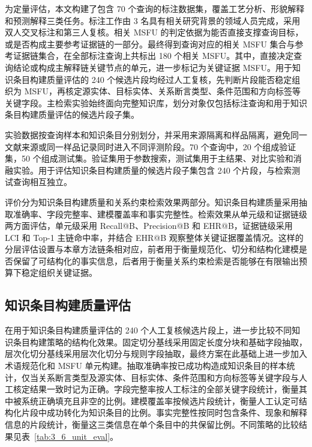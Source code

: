 为定量评估，本文构建了包含 70 个查询的标注数据集，覆盖工艺分析、形貌解释和预测解释三类任务。标注工作由 3 名具有相关研究背景的领域人员完成，采用双人交叉标注和第三人复核。相关 MSFU 的判定依据为能否直接支撑查询目标，或是否构成主要参考证据链的一部分。最终得到查询对应的相关 MSFU 集合与参考证据链集合，在全部标注查询上共标出 180 个相关 MSFU。其中，直接决定查询结论或构成主解释链关键节点的单元，进一步标记为关键证据 MSFU。用于知识条目构建质量评估的 240 个候选片段均经过人工复核，先判断片段能否稳定组织为 MSFU，再核定源实体、目标实体、关系断言类型、条件范围和方向标签等关键字段。主检索实验始终面向完整知识库，划分对象仅包括标注查询和用于知识条目构建质量评估的候选片段子集。

实验数据按查询样本和知识条目分别划分，并采用来源隔离和样品隔离，避免同一文献来源或同一样品记录同时进入不同评测阶段。70 个查询中，20 个组成验证集，50 个组成测试集。验证集用于参数搜索，测试集用于主结果、对比实验和消融实验。用于评估知识条目构建质量的候选片段子集包含 240 个片段，与检索测试查询相互独立。

评价分为知识条目构建质量和关系约束检索效果两部分。知识条目构建质量采用抽取准确率、字段完整率、建模覆盖率和事实完整性。检索效果从单元级和证据链级两方面评估，单元级采用 Recall@B、Precision@B 和 EHR@B，证据链级采用 LCI 和 Top-1 主链命中率，并结合 EHR@B 观察整体关键证据覆盖情况。这样的分层评估设置与本章方法链条相对应，前者用于衡量规范化、切分和结构化建模是否保留了可结构化的事实信息，后者用于衡量关系约束检索是否能够在有限输出预算下稳定组织关键证据。

\subsection{知识条目构建质量评估}

在用于知识条目构建质量评估的 240 个人工复核候选片段上，进一步比较不同知识条目构建策略的结构化效果。固定切分基线采用固定长度分块和基础字段抽取，层次化切分基线采用层次化切分与规则字段抽取，最终方案在此基础上进一步加入术语规范化和 MSFU 单元构建。抽取准确率按已成功构造成知识条目的样本统计，仅当关系断言类型及源实体、目标实体、条件范围和方向标签等关键字段与人工核定结果一致时记为正确。字段完整率按人工标注的全部关键字段统计，衡量其中被系统正确填充且非空的比例。建模覆盖率按候选片段统计，衡量人工认定可结构化片段中成功转化为知识条目的比例。事实完整性按同时包含条件、现象和解释信息的片段统计，衡量这三类信息在单个条目中的共保留比例。不同策略的比较结果见表~\ref{tab:3_6_unit_eval}。

